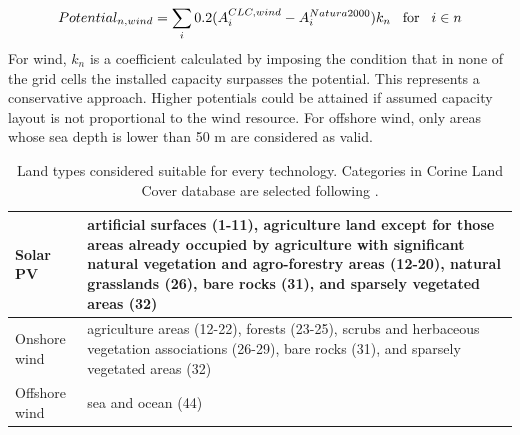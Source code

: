 \documentclass[3p]{elsarticle} %
\begin{document}
\begin{equation}
	Potential_{n, wind} = \sum_i 0.2 ( A^{CLC, wind}_i - A^{Natura 2000}_i) k_n \hspace{0.3cm} \text{for} \hspace{0.3cm}  i \in n
\end{equation}
For wind, $k_n$ is a coefficient calculated by imposing the condition that in none of the grid cells the installed capacity surpasses the potential. This represents a conservative approach. Higher potentials could be attained if assumed capacity layout is not proportional to the wind resource. For offshore wind, only areas whose sea depth is lower than 50 m are considered as valid. \\

\begin{table}[!h]
\footnotesize
\centering
\begin{threeparttable}
\caption{Land types considered suitable for every technology. Categories in Corine Land Cover database \cite{Corine_2014} are selected following \cite{Scholz_2012}.} \label{tab_Corine}
\centering
\begin{tabularx}{13cm}{lp{10cm}}
\toprule
Solar PV  & artificial surfaces (1-11), agriculture land except for those areas already occupied by agriculture with significant natural vegetation and agro-forestry areas (12-20), natural grasslands (26),
bare rocks (31), and sparsely vegetated areas (32) \\
\midrule
Onshore wind & agriculture areas (12-22), forests (23-25), scrubs and herbaceous vegetation associations (26-29), bare rocks (31), and sparsely vegetated areas (32) \\
\midrule
Offshore wind & sea and ocean (44) \\
\bottomrule
\end{tabularx}
\end{threeparttable}
\end{table}
\end{document}
